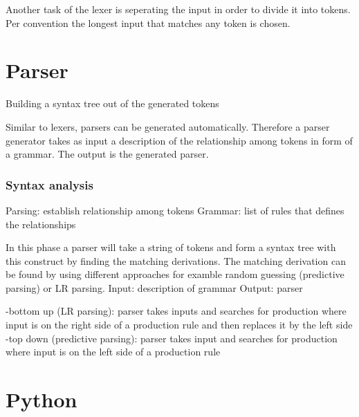 Another task of the lexer is seperating the input in order to divide it into tokens.
Per convention the longest input that matches any token is chosen. \cite{Mogensen.2017}






\section{Parser}\label{sec:BackgroundParser}
Building a syntax tree out of the generated tokens \cite{Mogensen.2017}

Similar to lexers, parsers can be generated automatically.
Therefore a parser generator takes as input a description of the relationship among tokens in form of a grammar. The output is the generated parser. \cite{LexYacc.1992}
 
\subsubsection{Syntax analysis}
Parsing: establish relationship among tokens \cite{LexYacc.1992}
Grammar: list of rules that defines the relationships \cite{LexYacc.1992}

In this phase a parser will take a string of tokens and form a syntax tree with this construct by finding the matching derivations. The matching derivation can be found by using different approaches for examble random guessing (predictive parsing) or LR parsing.
Input: description of grammar \cite{LexYacc.1992}
Output: parser \cite{LexYacc.1992}

-bottom up (LR parsing):
parser takes inputs and searches for production where input is on the right side of a production rule and then replaces it by the left side
-top down (predictive parsing):
parser takes input and searches for production where input is on the left side of a production rule

\section{Python}\label{sec:BackgroundPython}
